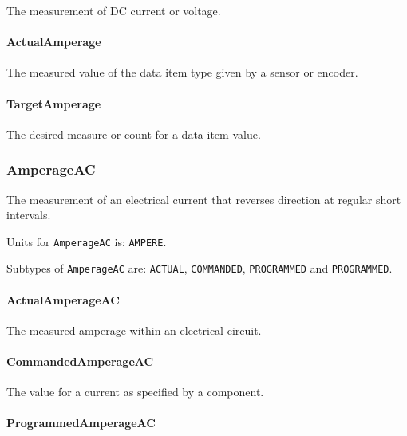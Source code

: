 The measurement of DC current or voltage.


\paragraph{ActualAmperage}\mbox{}
\label{sec:ActualAmperage}



The measured value of the data item type given by a sensor or encoder.


\paragraph{TargetAmperage}\mbox{}
\label{sec:TargetAmperage}



The desired measure or count for a data item value.


\subsubsection{AmperageAC}
\label{sec:AmperageAC}



The measurement of an electrical current that reverses direction at regular short intervals.


Units for \texttt{AmperageAC} is: \texttt{AMPERE}.


Subtypes of \texttt{AmperageAC} are: \texttt{ACTUAL}, \texttt{COMMANDED}, \texttt{PROGRAMMED} and \texttt{PROGRAMMED}. 
\FloatBarrier

\paragraph{ActualAmperageAC}\mbox{}
\label{sec:ActualAmperageAC}



The measured amperage within an electrical circuit.


\paragraph{CommandedAmperageAC}\mbox{}
\label{sec:CommandedAmperageAC}



The value for a current as specified by a component. 


\paragraph{ProgrammedAmperageAC}\mbox{}
\label{sec:ProgrammedAmperageAC}



